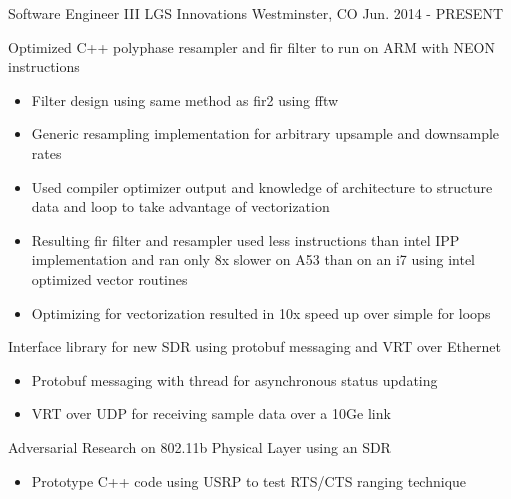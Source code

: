 

\begin{cventries}

  \cventry
    {Software Engineer III} %
    {LGS Innovations} %
    {Westminster, CO} %
    {Jun. 2014 - PRESENT} %
    {
      \begin{cvitems} %
        \item {Optimized C++ polyphase resampler and fir filter to run on ARM with NEON instructions}
        \begin{itemize}
          \item {Filter design using same method as fir2 using fftw}
          \item {Generic resampling implementation for arbitrary upsample and downsample rates}
          \item {Used compiler optimizer output and knowledge of architecture to structure data and loop to take advantage of vectorization}
          \item {Resulting fir filter and resampler used less instructions than intel IPP implementation and ran only 8x slower on A53 than on an i7 using intel optimized vector routines}
          \item {Optimizing for vectorization resulted in 10x speed up over simple for loops}
        \end{itemize}
        \item {Interface library for new SDR using protobuf messaging and VRT over Ethernet}
        \begin{itemize}
          \item {Protobuf messaging with thread for asynchronous status updating}
          \item {VRT over UDP for receiving sample data over a 10Ge link}
        \end{itemize}
        \item {Adversarial Research on 802.11b Physical Layer using an SDR}
        \begin{itemize}
          \item {Prototype C++ code using USRP to test RTS/CTS ranging technique}

\end{itemize}
\end{cvitems}}
\end{cventries}

